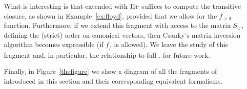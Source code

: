 What is interesting is that \langsum extended with $\Pi v$ suffices to compute the transitive closure,
as shown in Example~\ref{ex:floyd}, provided that we allow for the $f_{>0}$ function.
%
%
Furthermore, if we extend this fragment with access to the matrix $S_{<}$, defining the (strict) order on canonical vectors, then Csanky's matrix inversion algorithm becomes expressible (if $f_/$ is allowed).
 We leave the study of this fragment and, in particular, the relationship to full \langfor, for future work. 
 
Finally, in Figure~\ref{thefigure} we show a diagram of all the fragments of \langfor introduced in this section and their corresponding equivalent formalisms.
%
%
%

